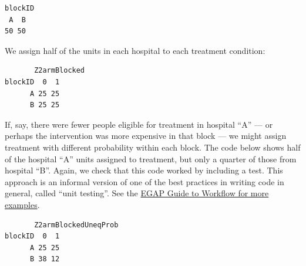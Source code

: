 \documentclass[
  12pt,
]{book}
\newenvironment{Shaded}{\begin{snugshade}}{\end{snugshade}}
\newcommand{\AttributeTok}[1]{\textcolor[rgb]{0.77,0.63,0.00}{#1}}
\newcommand{\DecValTok}[1]{\textcolor[rgb]{0.00,0.00,0.81}{#1}}
\newcommand{\FunctionTok}[1]{\textcolor[rgb]{0.00,0.00,0.00}{#1}}
\newcommand{\NormalTok}[1]{#1}
\newcommand{\OtherTok}[1]{\textcolor[rgb]{0.56,0.35,0.01}{#1}}
\newcommand{\SpecialCharTok}[1]{\textcolor[rgb]{0.00,0.00,0.00}{#1}}
\theoremstyle{definition}
\theoremstyle{definition}
\theoremstyle{definition}
\theoremstyle{remark}
\begin{document}
\begin{verbatim}
blockID
 A  B 
50 50 
\end{verbatim}

We assign half of the units in each hospital to each treatment
condition:

\begin{Shaded}
\end{Shaded}

\begin{verbatim}
       Z2armBlocked
blockID  0  1
      A 25 25
      B 25 25
\end{verbatim}

If, say, there were fewer people eligible for treatment in hospital
``A'' --- or perhaps the intervention was more expensive in that block
--- we might assign treatment with different probability within each
block. The code below shows half of the hospital ``A'' units assigned to
treatment, but only a quarter of those from hospital ``B''. Again, we
check that this code worked by including a test. This approach is an
informal version of one of the best practices in writing code in
general, called ``unit testing''. See the
\href{https://rawgit.com/egap/methods-guides/master/workflow/workflow.html\#to-minimize-error-build-testing-into-the-code}{EGAP
Guide to Workflow for more examples}.

\begin{Shaded}
\end{Shaded}

\begin{verbatim}
       Z2armBlockedUneqProb
blockID  0  1
      A 25 25
      B 38 12
\end{verbatim}
\end{document}
